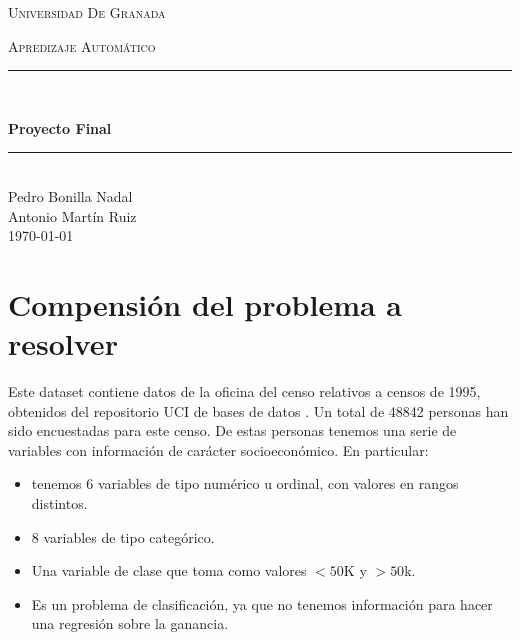 \documentclass[11pt,a4paper]{article}
\date{\today}
\begin{document}
\begin{titlepage}
\begin{center}

\vspace*{.06\textheight}
{\scshape\LARGE Universidad De Granada\par}\vspace{1.5cm} %
\textsc{\Large Apredizaje Automático}\\[0.5cm] %

\rule{\textwidth}{0.4mm} \\[0.4cm] %
{\huge \bfseries Proyecto Final\par}\vspace{0.4cm} %

\rule{\textwidth}{0.4mm} \\[11.5cm] %
 {\Large Pedro Bonilla Nadal\\Antonio Martín Ruiz}\\[1cm]

 {\today}

\vfill
\end{center}
\end{titlepage}

\setcounter{tocdepth}{2}
\tableofcontents
\newpage



\section{Compensión del problema a resolver }

Este dataset contiene datos de la oficina del censo\cite{census} relativos a censos de 1995, obtenidos del repositorio UCI de bases de datos \cite{uci}. Un total de 48842 personas han sido encuestadas para este censo. De estas personas tenemos una serie de variables con información de carácter socioeconómico. En particular:
\begin{itemize}
\item tenemos 6 variables de tipo numérico u ordinal, con valores en rangos distintos.
\item 8 variables de tipo categórico.
\item Una variable de clase que toma como valores $<50$K y $>50$k.
\item Es un problema de clasificación, ya que no tenemos información para hacer una regresión sobre la ganancia.
\end{itemize}
\end{document}
